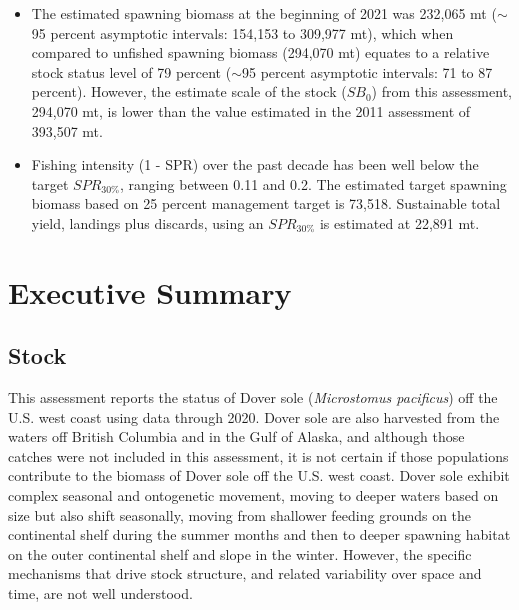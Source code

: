 \documentclass[11pt,
  english,
  a4paper,
]{article}
\begin{document}
\begin{itemize}
\item The estimated spawning biomass at the beginning of 2021 was 232,065 mt ($\sim$95 percent asymptotic intervals: 154,153 to 309,977 mt), which when compared to unfished spawning biomass (294,070 mt) equates to a relative stock status level of 79 percent ($\sim$95 percent asymptotic intervals: 71 to 87 percent).  However, the estimate scale of the stock ($SB_0$) from this assessment, 294,070 mt, is lower than the value estimated in the 2011 assessment of 393,507 mt.

\item  Fishing intensity (1 - SPR) over the past decade has been well below the target $SPR_{30\%}$, ranging between 0.11 and 0.2. The estimated target spawning biomass based on 25 percent management target is 73,518. Sustainable total yield, landings plus discards, using an $SPR_{30\%}$ is estimated at 22,891 mt.   

\end{itemize}

\newpage


\hypertarget{executive-summary}{%
\section*{Executive Summary}\label{executive-summary}}

\leavevmode\tagmcend\tagstructend


\hypertarget{stock}{%
\subsection*{Stock}\label{stock}}

\leavevmode\tagmcend\tagstructend


This assessment reports the status of Dover sole (\emph{Microstomus pacificus}) off the U.S. west coast using data through 2020. Dover sole are also harvested from the waters off British Columbia and in the Gulf of Alaska, and although those catches were not included in this assessment, it is not certain if those populations contribute to the biomass of Dover sole off the U.S. west coast. Dover sole exhibit complex seasonal and ontogenetic movement, moving to deeper waters based on size but also shift seasonally, moving from shallower feeding grounds on the continental shelf during the summer months and then to deeper spawning habitat on the outer continental shelf and slope in the winter. However, the specific mechanisms that drive stock structure, and related variability over space and time, are not well understood.
\end{document}
